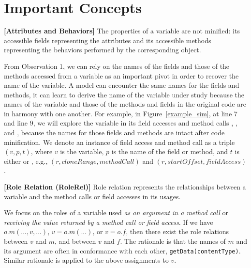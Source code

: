 \section{Important Concepts}
\label{concepts:sec}

\begin{definition}{\bf [Attributes and Behaviors]}
The properties of a variable are not minified: its accessible fields
representing the attributes and its accessible methods representing
the behaviors performed by the corresponding object.
\end{definition}

From Observation 1, we can rely on the names of the fields and those
of the methods accessed from a variable as an important pivot in order
to recover the name of the variable. A model can encounter the same
names for the fields and methods, it can learn to derive the name of
the variable under study because the names of the variable and those
of the methods and fields in the original code are in harmony with one
another. For example, in Figure~\ref{example_sim}, at line 7 and line
9, we will explore the variable  in its field accesses and
method calls , , and
, because the names for those fields and methods are
intact after code minification. We denote an instance of field access
and method call as a triple $(v, p, t)$, where $v$ is the variable,
$p$ is the name of the field or method, and $t$ is either
 or , e.g., $(r, cloneRange,
methodCall)$ and $(r, startOffset, fieldAccess)$.


\begin{definition}{\bf [Role Relation (RoleRel)]}
  Role relation represents the relationships between a variable and
  the method calls or field accesses in its usages.
\end{definition}


%
We focus on the roles of a variable used {\em as an argument in a method call}
 or {\em receiving the value returned by a method call or field access}.
%
If we have $o.m(...,v,...)$, $v = o.m(...)$, or $v = o.f$,
then there exist
the role relations between $v$ and $m$, and between $v$ and $f$. The
rationale is that the names of $m$ and its argument are often in
conformance with each other, \eg
\texttt{getData(contentType)}. Similar rationale is applied to the
above assignments to $v$.


